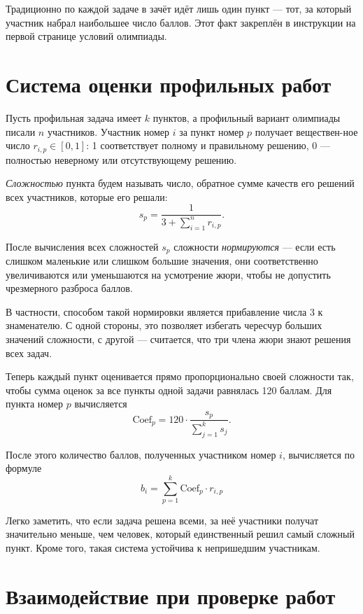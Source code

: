 \documentclass[a4paper,12pt]{article}
\begin{document}
Традиционно по каждой задаче в зачёт идёт лишь один пункт — тот, за который участник набрал наибольшее число баллов. Этот факт закреплён в инструкции на первой странице условий олимпиады.

\section{Система оценки профильных работ}

Пусть профильная задача имеет $k$ пунктов, а профильный вариант олимпиады писали
$n$ участников. Участник номер $i$ за пункт номер $p$ получает веществен-\linebreak ное число
$r_{i,p} \in [0,1]$:
1 соответствует полному и правильному решению, 0 — полностью неверному или отсутствующему решению.

{\it Сложностью} пункта будем называть число, обратное сумме
качеств его решений всех участников, которые его решали:
	$$s_p = \frac{1}{3 + \sum\limits_{i=1}^n r_{i,p}}.$$

После вычисления всех сложностей $s_p$ сложности
{\it нормируются} — если есть слишком маленькие или слишком большие значения, они соответственно
увеличиваются или уменьшаются на усмотрение жюри, чтобы не допустить чрезмерного разброса баллов.

В частности, способом такой нормировки является прибавление числа 3 к знаменателю. С одной стороны,
это позволяет избегать чересчур больших значений сложности, с другой — считается, что три члена жюри
знают решения всех задач.

\def\Coef{\text{Coef}}
Теперь каждый пункт оценивается прямо пропорционально своей сложности так,
чтобы сумма оценок за все пункты одной задачи равнялась 120 баллам. Для пункта номер $p$ вычисляется
	$$\Coef_p = 120 \cdot \frac{s_p}{\sum\limits_{j=1}^{k} s_j}.$$

После этого количество баллов, полученных участником номер $i$, вычисляется по формуле
	$$b_i = \sum\limits_{p=1}^{k} \Coef_p \cdot r_{i,p}$$

Легко заметить, что если задача решена всеми, за неё участники получат значительно меньше, чем человек,
который единственный решил самый сложный пункт. Кроме того, такая система устойчива к непришедшим участникам.

\section{Взаимодействие при проверке работ}
\end{document}
